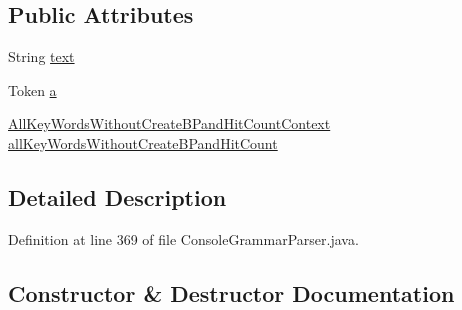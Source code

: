\subsection*{Public Attributes}
\begin{DoxyCompactItemize}
\item 
String \hyperlink{classgov_1_1nasa_1_1jpf_1_1inspector_1_1client_1_1parser_1_1_console_grammar_parser_1_1_all_key_4612626c1f72cea22831f9624187dc64_a6bdb364f0f2292d6668735e4057040da}{text}
\item 
Token \hyperlink{classgov_1_1nasa_1_1jpf_1_1inspector_1_1client_1_1parser_1_1_console_grammar_parser_1_1_all_key_4612626c1f72cea22831f9624187dc64_ae397035776595b9f155b986996f08de8}{a}
\item 
\hyperlink{classgov_1_1nasa_1_1jpf_1_1inspector_1_1client_1_1parser_1_1_console_grammar_parser_1_1_all_key_5423188b2439879f44801649cdee10f6}{All\+Key\+Words\+Without\+Create\+B\+Pand\+Hit\+Count\+Context} \hyperlink{classgov_1_1nasa_1_1jpf_1_1inspector_1_1client_1_1parser_1_1_console_grammar_parser_1_1_all_key_4612626c1f72cea22831f9624187dc64_aa664dbad1a9968ed7ce756a212071e65}{all\+Key\+Words\+Without\+Create\+B\+Pand\+Hit\+Count}
\end{DoxyCompactItemize}


\subsection{Detailed Description}


Definition at line 369 of file Console\+Grammar\+Parser.\+java.



\subsection{Constructor \& Destructor Documentation}
